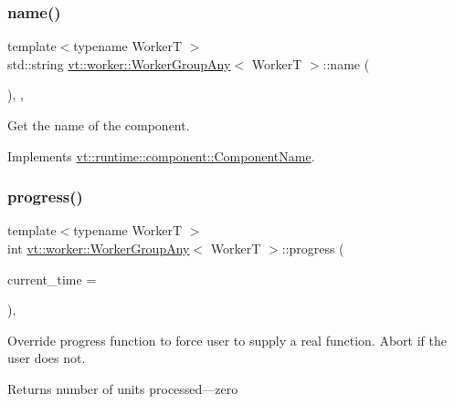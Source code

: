 \subsubsection{\texorpdfstring{name()}{name()}}
{\footnotesize\ttfamily template$<$typename WorkerT $>$ \\
std\+::string \hyperlink{structvt_1_1worker_1_1_worker_group_any}{vt\+::worker\+::\+Worker\+Group\+Any}$<$ WorkerT $>$\+::name (\begin{DoxyParamCaption}{ }\end{DoxyParamCaption})\hspace{0.3cm}{\ttfamily [inline]}, {\ttfamily [override]}, {\ttfamily [virtual]}}



Get the name of the component. 



Implements \hyperlink{structvt_1_1runtime_1_1component_1_1_component_name_a33c06229bb605a2b2ceff68830d6d773}{vt\+::runtime\+::component\+::\+Component\+Name}.

\mbox{\label{structvt_1_1worker_1_1_worker_group_any_a9b71b3e44ee938d873adce83d51dee33}} 
\subsubsection{\texorpdfstring{progress()}{progress()}}
{\footnotesize\ttfamily template$<$typename WorkerT $>$ \\
int \hyperlink{structvt_1_1worker_1_1_worker_group_any}{vt\+::worker\+::\+Worker\+Group\+Any}$<$ WorkerT $>$\+::progress (\begin{DoxyParamCaption}\item[{\hyperlink{namespacevt_a876a9d0cd5a952859c72de8a46881442}{Time\+Type}}]{current\+\_\+time = {} }\end{DoxyParamCaption})\hspace{0.3cm}{\ttfamily [override]}, {\ttfamily [virtual]}}



Override progress function to force user to supply a real function. Abort if the user does not. 

\begin{DoxyReturn}{Returns}
number of units processed---zero 
\end{DoxyReturn}


